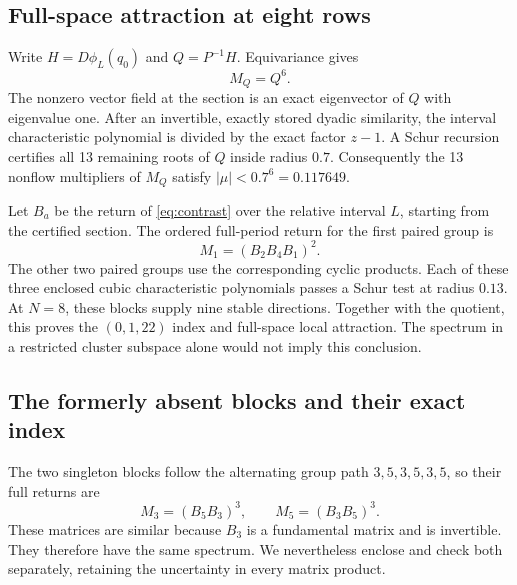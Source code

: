 \documentclass[11pt]{article}
\begin{document}
\subsection{Full-space attraction at eight rows}
Write $H=D\phi_L(q_0)$ and $Q=P^{-1}H$. Equivariance gives
\begin{equation}
 M_Q=Q^6.\label{eq:relative}
\end{equation}
The nonzero vector field at the section is an exact eigenvector of $Q$
with eigenvalue one. After an invertible, exactly stored dyadic similarity,
the interval characteristic polynomial is divided by the exact factor
$z-1$. A Schur recursion certifies all 13 remaining roots of $Q$ inside
radius $0.7$. Consequently the 13 nonflow multipliers of $M_Q$ satisfy
$|\mu|<0.7^6=0.117649$.

Let $B_a$ be the return of \eqref{eq:contrast} over the relative interval
$L$, starting from the certified section. The ordered full-period return
for the first paired group is
\begin{equation}
 M_1=(B_2B_4B_1)^2.\label{eq:pairs}
\end{equation}
The other two paired groups use the corresponding cyclic products. Each
of these three enclosed cubic characteristic polynomials passes a Schur
test at radius $0.13$. At $N=8$, these blocks supply nine stable directions.
Together with the quotient, this proves the $(0,1,22)$ index and full-space
local attraction. The spectrum in a restricted cluster subspace alone
would not imply this conclusion.

\subsection{The formerly absent blocks and their exact index}
The two singleton blocks follow the alternating group path $3,5,3,5,3,5$,
so their full returns are
\begin{equation}
 M_3=(B_5B_3)^3,\qquad M_5=(B_3B_5)^3.\label{eq:singleton}
\end{equation}
These matrices are similar because $B_3$ is a fundamental matrix and is
invertible. They therefore have the same spectrum. We nevertheless
enclose and check both separately, retaining the uncertainty in every
matrix product.
\end{document}

